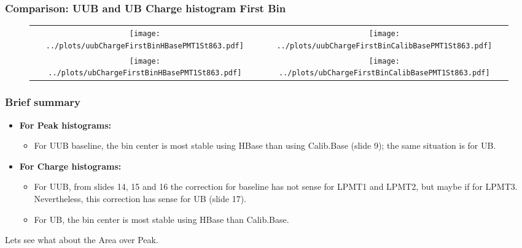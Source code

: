\documentclass[aspectratio=169]{beamer}
\begin{document}
\begin{frame}
	\frametitle{Comparison: UUB and UB Charge histogram First Bin}
	
	\begin{figure}
		\centering
		\begin{tabularx}{\textwidth}{CC}
			\texttt{[image: ../plots/uubChargeFirstBinHBasePMT1St863.pdf]}
			&
			\texttt{[image: ../plots/uubChargeFirstBinCalibBasePMT1St863.pdf]}
			\\
			\texttt{[image: ../plots/ubChargeFirstBinHBasePMT1St863.pdf]}
			&
			\texttt{[image: ../plots/ubChargeFirstBinCalibBasePMT1St863.pdf]}
		\end{tabularx}
	\end{figure}
\end{frame}



\begin{frame}
	\frametitle{Brief summary}
	\begin{itemize}
		\item {\bf For Peak histograms:}
			\begin{itemize}
					\item For UUB baseline, the bin center is most stable using HBase 
						than using Calib.Base (slide 9); the same situation is for UB.
			\end{itemize}
			\vspace{0.5cm}
		\item {\bf For Charge histograms:}
			\begin{itemize}
					\item For UUB, from slides 14, 15 and 16 the correction for 
						baseline has not sense for LPMT1 and LPMT2, but maybe if for 
						LPMT3. Nevertheless, this correction has sense for UB (slide 17).
					\item For UB, the bin center is most stable using HBase than Calib.Base.
			\end{itemize}
	\end{itemize}
	\vspace{0.5cm}
	Lets see what about the Area over Peak.

\end{frame}
\end{document}

